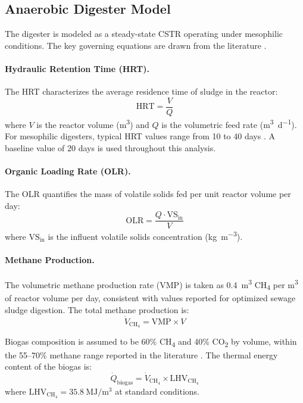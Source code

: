 \documentclass[12pt, letterpaper]{article}
\begin{document}
\subsection{Anaerobic Digester Model}

The digester is modeled as a steady-state CSTR operating under mesophilic conditions. The key governing equations are drawn from the literature \citep{nathia2018}.

\paragraph{Hydraulic Retention Time (HRT).}
The HRT characterizes the average residence time of sludge in the reactor:
\begin{equation}
  \text{HRT} = \frac{V}{Q}
  \label{eq:hrt}
\end{equation}
where $V$ is the reactor volume (\si{\cubic\metre}) and $Q$ is the volumetric feed rate (\si{\cubic\metre\per\day}). For mesophilic digesters, typical HRT values range from 10 to 40 days \citep{nathia2018}. A baseline value of 20 days is used throughout this analysis.

\paragraph{Organic Loading Rate (OLR).}
The OLR quantifies the mass of volatile solids fed per unit reactor volume per day:
\begin{equation}
  \text{OLR} = \frac{Q \cdot \text{VS}_\text{in}}{V}
  \label{eq:olr}
\end{equation}
where $\text{VS}_\text{in}$ is the influent volatile solids concentration (\si{\kilo\gram\per\cubic\metre}).

\paragraph{Methane Production.}
The volumetric methane production rate (VMP) is taken as \SI{0.4}{\cubic\metre} CH\textsubscript{4} per \si{\cubic\metre} of reactor volume per day, consistent with values reported for optimized sewage sludge digestion. The total methane production is:
\begin{equation}
  \dot{V}_{\text{CH}_4} = \text{VMP} \times V
  \label{eq:ch4}
\end{equation}

Biogas composition is assumed to be 60\% CH\textsubscript{4} and 40\% CO\textsubscript{2} by volume, within the 55--70\% methane range reported in the literature \citep{nathia2018}. The thermal energy content of the biogas is:
\begin{equation}
  \dot{Q}_\text{biogas} = \dot{V}_{\text{CH}_4} \times \text{LHV}_{\text{CH}_4}
  \label{eq:q_biogas}
\end{equation}
where $\text{LHV}_{\text{CH}_4} = \SI{35.8}{\mega\joule\per\cubic\metre}$ at standard conditions.
\end{document}
